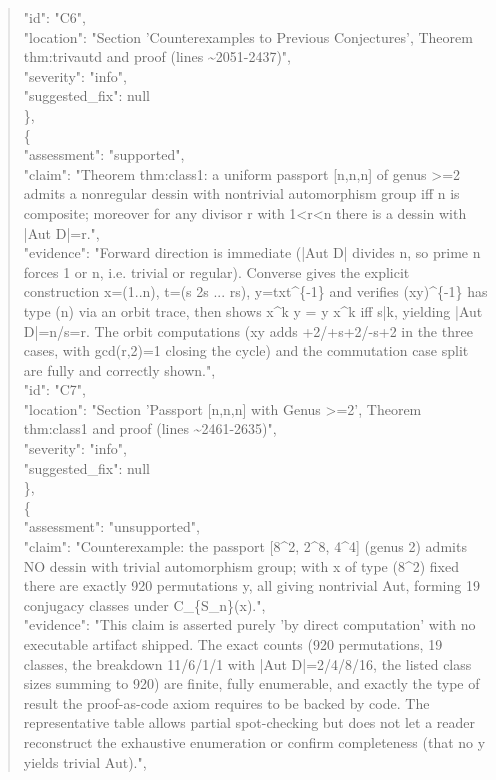 \documentclass[11pt]{article}
\begin{document}
\begin{quote}
      "id": "C6",\\
      "location": "Section 'Counterexamples to Previous Conjectures', Theorem thm:trivautd and proof (lines \~{}2051-2437)",\\
      "severity": "info",\\
      "suggested\_fix": null\\
    \},\\
    \{\\
      "assessment": "supported",\\
      "claim": "Theorem thm:class1: a uniform passport [n,n,n] of genus >=2 admits a nonregular dessin with nontrivial automorphism group iff n is composite; moreover for any divisor r with 1<r<n there is a dessin with |Aut D|=r.",\\
      "evidence": "Forward direction is immediate (|Aut D| divides n, so prime n forces 1 or n, i.e. trivial or regular). Converse gives the explicit construction x=(1..n), t=(s 2s ... rs), y=txt\^{}\{-1\} and verifies (xy)\^{}\{-1\} has type (n) via an orbit trace, then shows x\^{}k y = y x\^{}k iff s|k, yielding |Aut D|=n/s=r. The orbit computations (xy adds +2/+s+2/-s+2 in the three cases, with gcd(r,2)=1 closing the cycle) and the commutation case split are fully and correctly shown.",\\
      "id": "C7",\\
      "location": "Section 'Passport [n,n,n] with Genus >=2', Theorem thm:class1 and proof (lines \~{}2461-2635)",\\
      "severity": "info",\\
      "suggested\_fix": null\\
    \},\\
    \{\\
      "assessment": "unsupported",\\
      "claim": "Counterexample: the passport [8\^{}2, 2\^{}8, 4\^{}4] (genus 2) admits NO dessin with trivial automorphism group; with x of type (8\^{}2) fixed there are exactly 920 permutations y, all giving nontrivial Aut, forming 19 conjugacy classes under C\_\{S\_n\}(x).",\\
      "evidence": "This claim is asserted purely 'by direct computation' with no executable artifact shipped. The exact counts (920 permutations, 19 classes, the breakdown 11/6/1/1 with |Aut D|=2/4/8/16, the listed class sizes summing to 920) are finite, fully enumerable, and exactly the type of result the proof-as-code axiom requires to be backed by code. The representative table allows partial spot-checking but does not let a reader reconstruct the exhaustive enumeration or confirm completeness (that no y yields trivial Aut).",\\

\end{quote}
\end{document}
